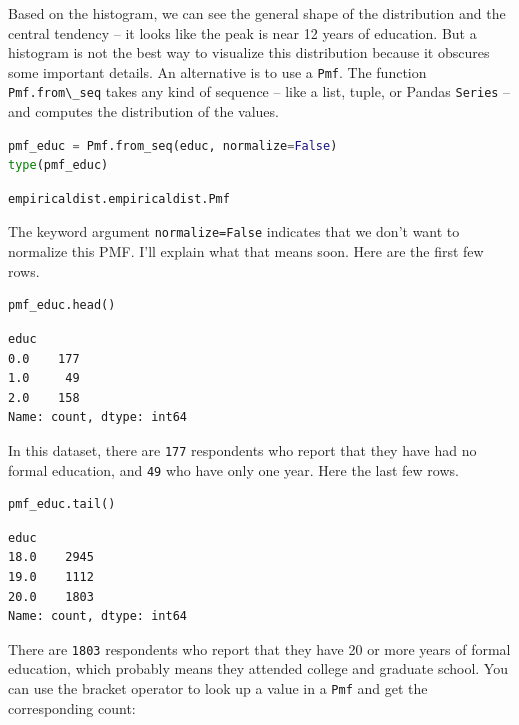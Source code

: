 Based on the histogram, we can see the general shape of the distribution
and the central tendency -- it looks like the peak is near 12 years of
education. But a histogram is not the best way to visualize this
distribution because it obscures some important details. An alternative
is to use a \passthrough{\lstinline!Pmf!}. The function
\passthrough{\lstinline!Pmf.from\_seq!} takes any kind of sequence --
like a list, tuple, or Pandas \passthrough{\lstinline!Series!} -- and
computes the distribution of the values.

\begin{lstlisting}[language=Python,style=source]
pmf_educ = Pmf.from_seq(educ, normalize=False)
type(pmf_educ)
\end{lstlisting}

\begin{lstlisting}[style=output]
empiricaldist.empiricaldist.Pmf
\end{lstlisting}

The keyword argument \passthrough{\lstinline!normalize=False!} indicates
that we don't want to normalize this PMF. I'll explain what that means
soon. Here are the first few rows.

\begin{lstlisting}[language=Python,style=source]
pmf_educ.head()
\end{lstlisting}

\begin{lstlisting}[style=output]
educ
0.0    177
1.0     49
2.0    158
Name: count, dtype: int64
\end{lstlisting}

In this dataset, there are \passthrough{\lstinline!177!} respondents who
report that they have had no formal education, and
\passthrough{\lstinline!49!} who have only one year. Here the last few
rows.

\begin{lstlisting}[language=Python,style=source]
pmf_educ.tail()
\end{lstlisting}

\begin{lstlisting}[style=output]
educ
18.0    2945
19.0    1112
20.0    1803
Name: count, dtype: int64
\end{lstlisting}

There are \passthrough{\lstinline!1803!} respondents who report that
they have 20 or more years of formal education, which probably means
they attended college and graduate school. You can use the bracket
operator to look up a value in a \passthrough{\lstinline!Pmf!} and get
the corresponding count:

